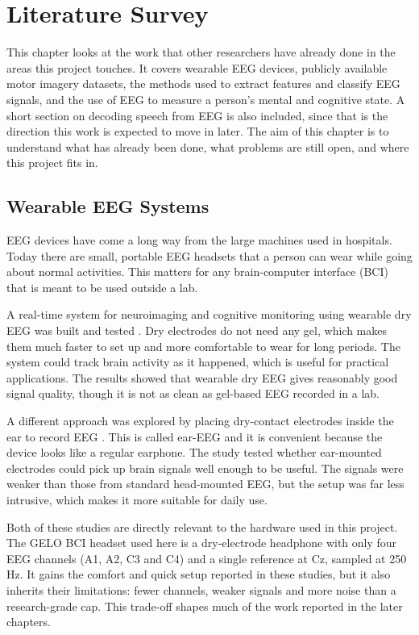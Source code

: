 \chapter{Literature Survey}

This chapter looks at the work that other researchers have already done in the areas this
project touches. It covers wearable EEG devices, publicly available motor imagery
datasets, the methods used to extract features and classify EEG signals, and the use of
EEG to measure a person's mental and cognitive state. A short section on decoding speech
from EEG is also included, since that is the direction this work is expected to move in
later. The aim of this chapter is to understand what has already been done, what problems
are still open, and where this project fits in.

\section{Wearable EEG Systems}

EEG devices have come a long way from the large machines used in hospitals. Today there
are small, portable EEG headsets that a person can wear while going about normal
activities. This matters for any brain-computer interface (BCI) that is meant to be used
outside a lab.

A real-time system for neuroimaging and cognitive monitoring using wearable dry EEG was
built and tested \cite{mullen2015wearable}. Dry electrodes do not need any gel, which
makes them much faster to set up and more comfortable to wear for long periods. The system
could track brain activity as it happened, which is useful for practical applications. The
results showed that wearable dry EEG gives reasonably good signal quality, though it is
not as clean as gel-based EEG recorded in a lab.

A different approach was explored by placing dry-contact electrodes inside the ear to
record EEG \cite{kappel2019earEEG}. This is called ear-EEG and it is convenient because
the device looks like a regular earphone. The study tested whether ear-mounted electrodes
could pick up brain signals well enough to be useful. The signals were weaker than those
from standard head-mounted EEG, but the setup was far less intrusive, which makes it more
suitable for daily use.

Both of these studies are directly relevant to the hardware used in this project. The GELO
BCI headset used here is a dry-electrode headphone with only four EEG channels (A1, A2, C3
and C4) and a single reference at Cz, sampled at 250 Hz. It gains the comfort and quick
setup reported in these studies, but it also inherits their limitations: fewer channels,
weaker signals and more noise than a research-grade cap. This trade-off shapes much of the
work reported in the later chapters.

